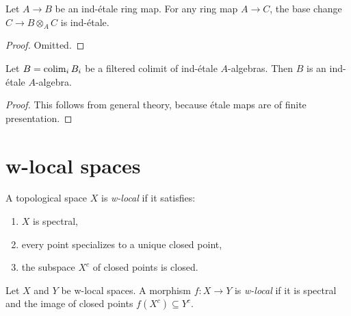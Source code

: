 \begin{lemma}
  \label{thm:ind-etale-base-change}
  Let $A \to B$ be an ind-étale ring map. For any ring map $A \to C$, the base change $C \to B \otimes_A C$ is ind-étale.
\end{lemma}

\begin{proof}
  Omitted.
\end{proof}

\begin{lemma}
    Let $B = \operatorname{colim}_i B_i$ be a filtered colimit of ind-étale $A$-algebras. Then $B$ is
    an ind-étale $A$-algebra.
    \label{lemma:ind-ind-etale}
\end{lemma}

\begin{proof}
    This follows from general theory, because étale maps are of finite presentation.
\end{proof}

\section{w-local spaces}

\begin{definition}
    \label{def:w-local-space}
    \leanok
    A topological space \(X\) is \emph{w-local} if it satisfies:
    \begin{enumerate}
        \item \(X\) is spectral,
        \item every point specializes to a unique closed point,
        \item the subspace \(X^c\) of closed points is closed.
    \end{enumerate}
\end{definition}

\begin{definition}
    Let \(X\) and \(Y\) be w-local spaces. A morphism \(f: X \to Y\) is \emph{w-local} if it is spectral and the image of closed points \(f(X^c) \subseteq Y^c\).
    \label{def:w-local-space-map}
    \leanok
\end{definition}

